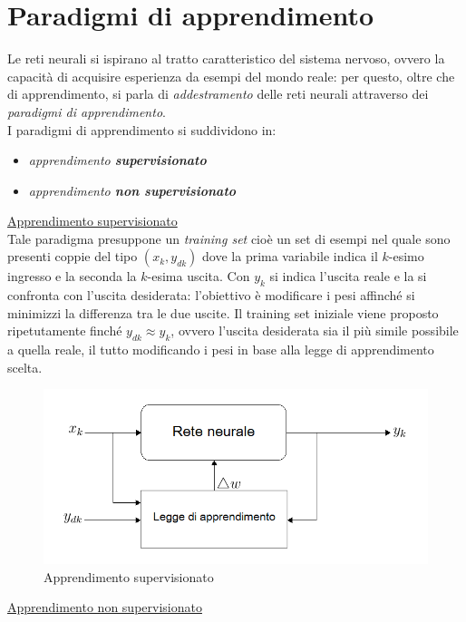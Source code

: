 \documentclass[12pt,a4paper,oneside]{book}
\begin{document}
		
	\section{Paradigmi di apprendimento}	
		Le reti neurali si ispirano al tratto caratteristico del sistema nervoso, ovvero la capacità di acquisire esperienza da esempi del mondo reale: per questo, oltre che di apprendimento, si parla di \emph{addestramento} delle reti neurali attraverso dei \textit{paradigmi di apprendimento}.\\
		I paradigmi di apprendimento si suddividono in:
		
		\begin{itemize}
			\item \emph{apprendimento \textbf{supervisionato} }
			\item \emph{apprendimento \textbf{non supervisionato}}
		\end{itemize}
	
		\underline{Apprendimento supervisionato}\\
		Tale paradigma presuppone un \emph{training set} cioè un set di esempi nel quale sono presenti coppie del tipo $(x_{k},y_{dk})$ dove la prima variabile indica il $k$-esimo ingresso e la seconda la $k$-esima uscita. Con $y_{k}$ si indica l'uscita reale e la si confronta con l'uscita desiderata: l'obiettivo è modificare i pesi affinché si minimizzi la differenza tra le due uscite. Il training set iniziale viene proposto ripetutamente finché $y_{dk}\approx y_{k}$, ovvero l'uscita desiderata sia il più simile possibile a quella reale, il tutto modificando i pesi in base alla legge di apprendimento scelta.\\
	
		\begin{figure}[h]
			\centering
			\includegraphics[width=0.7\linewidth]{IMMAGINI/supervisionato}
			\caption{ Apprendimento supervisionato }
			\label{fig:supervisionato}
		\end{figure}
		
		\clearpage
		\underline{Apprendimento non supervisionato}\\
		
\end{document}
